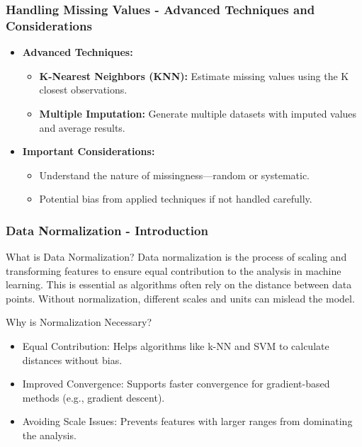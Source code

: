 \documentclass[aspectratio=169]{beamer}
\begin{document}
\begin{frame}[fragile]
    \frametitle{Handling Missing Values - Advanced Techniques and Considerations}
    \begin{itemize}
        \item \textbf{Advanced Techniques:}
        \begin{itemize}
            \item \textbf{K-Nearest Neighbors (KNN):} Estimate missing values using the K closest observations.
            \item \textbf{Multiple Imputation:} Generate multiple datasets with imputed values and average results.
        \end{itemize}
        
        \item \textbf{Important Considerations:}
        \begin{itemize}
            \item Understand the nature of missingness—random or systematic.
            \item Potential bias from applied techniques if not handled carefully.
        \end{itemize}
    \end{itemize}
\end{frame}

\begin{frame}[fragile]
    \frametitle{Data Normalization - Introduction}
    \begin{block}{What is Data Normalization?}
        Data normalization is the process of scaling and transforming features to ensure equal contribution to the analysis in machine learning. 
        This is essential as algorithms often rely on the distance between data points. Without normalization, different scales and units can mislead the model.
    \end{block}
    
    \begin{block}{Why is Normalization Necessary?}
        \begin{itemize}
            \item Equal Contribution: Helps algorithms like k-NN and SVM to calculate distances without bias.
            \item Improved Convergence: Supports faster convergence for gradient-based methods (e.g., gradient descent).
            \item Avoiding Scale Issues: Prevents features with larger ranges from dominating the analysis.
        \end{itemize}
    \end{block}
\end{frame}
\end{document}

